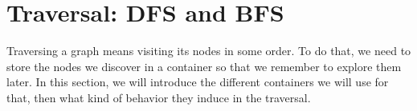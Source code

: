 \section{Traversal: DFS and BFS}

Traversing a graph means visiting its nodes in some order.
To do that, we need to store the nodes we discover in a container
so that we remember to explore them later.
In this section, we will introduce the different containers
we will use for that,
then what kind of behavior they induce in the traversal.





